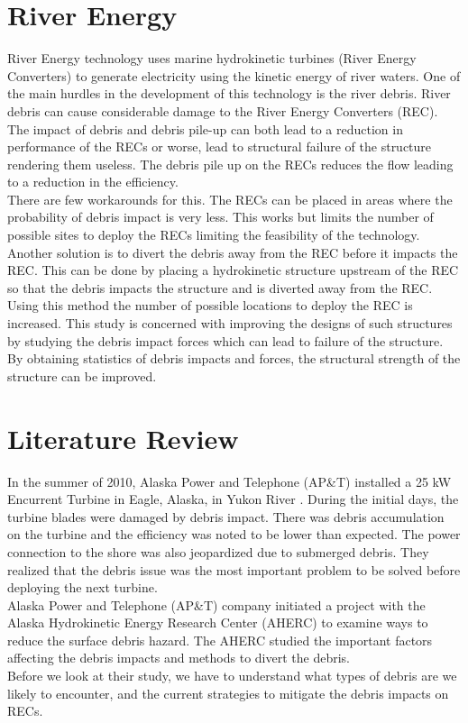 \section{River Energy}
River Energy technology uses marine hydrokinetic turbines (River Energy Converters) to generate electricity using the kinetic energy of river waters. One of the main hurdles in the development of this technology is the river debris. River debris can cause considerable damage to the River Energy Converters (REC). The impact of debris and debris pile-up can both lead to a reduction in performance of the RECs or worse, lead to structural failure of the structure rendering them useless. The debris pile up on the RECs reduces the flow leading to a reduction in the efficiency.\\
There are few workarounds for this. The RECs can be placed in areas where the probability of debris impact is very less. This works but limits the number of possible sites to deploy the RECs limiting the feasibility of the technology.  Another solution is to divert the debris away from the REC before it impacts the REC. This can be done by placing a hydrokinetic structure upstream of the REC so that the debris impacts the structure and is diverted away from the REC. Using this method the number of possible locations to deploy the REC is increased. This study is concerned with improving the designs of such structures by studying the debris impact forces which can lead to failure of the structure. By obtaining statistics of debris impacts and forces, the structural strength of the structure can be improved.

\section{Literature Review}
In the summer of 2010, Alaska Power and Telephone (AP\&T) installed a 25 kW Encurrent Turbine in Eagle, Alaska, in Yukon River \cite{Reference1}. During the initial days, the turbine blades were damaged by debris impact. There was debris accumulation on the turbine and the efficiency was noted to be lower than expected. The power connection to the shore was also jeopardized due to submerged debris. They realized that the debris issue was the most important problem to be solved before deploying the next turbine.\\
Alaska Power and Telephone (AP\&T) company initiated a project with the Alaska Hydrokinetic Energy Research Center (AHERC) to examine ways to reduce the surface debris hazard. The AHERC studied the important factors affecting the debris impacts and methods to divert the debris.\\
Before we look at their study, we have to understand what types of debris are we likely to encounter, and the current strategies to mitigate the debris impacts on RECs.

